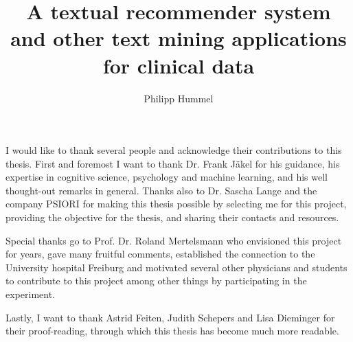 \documentclass[11pt, twoside, openright, utf8, bachelor, english, subfiles]{base/thesis}
\institute{Institute of Cognitive Science}
\title{A textual recommender system and other text mining applications for clinical data}
\author{Philipp Hummel}
\begin{document}
\maketitle

\begin{abstract}

\end{abstract}

\begin{acknowledgements}
I would like to thank several people and acknowledge their contributions to this thesis. First and foremost I want to thank Dr. Frank Jäkel for his guidance, his expertise in cognitive science, psychology and machine learning, and his well thought-out remarks in general. Thanks also to Dr. Sascha Lange and the company PSIORI for making this thesis possible by selecting me for this project, providing the objective for the thesis, and sharing their contacts and resources.

Special thanks go to Prof. Dr. Roland Mertelsmann who envisioned this project for years, gave many fruitful comments, established the connection to the University hospital Freiburg and motivated several other physicians and students to contribute to this project among other things by participating in the experiment.

Lastly, I want to thank Astrid Feiten, Judith Schepers and Lisa Dieminger for their proof-reading, through which this thesis has become much more readable.
\end{acknowledgements}

\tableofcontents

\mainpart






%
%
%
%

\appendix






\declaration
\end{document}
